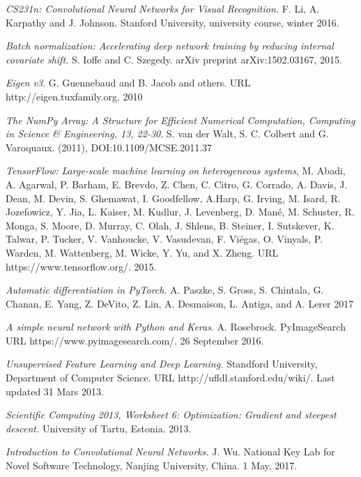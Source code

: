 \documentclass[a4paper, twoside]{article}
\begin{document}
\begin{thebibliography}{99}	
	\textit{CS231n: Convolutional Neural Networks for Visual Recognition.}
    F. Li, A. Karpathy and J. Johnson.
	Stanford University, university course, winter 2016.
	
	\textit{Batch normalization: Accelerating deep network training by reducing internal covariate shift.}
    S. Ioffe and C. Szegedy. 
	arXiv preprint arXiv:1502.03167, 2015.

\textit{Eigen v3}.
G. Guennebaud and B. Jacob and others. URL http://eigen.tuxfamily.org. 2010

\textit{The NumPy Array: A Structure for Efficient Numerical Computation, Computing in Science \& Engineering, 13, 22-30}.
S. van der Walt, S. C. Colbert and G. Varoquaux.  (2011), DOI:10.1109/MCSE.2011.37 

 

\textit{TensorFlow: Large-scale machine learning on heterogeneous systems},
M. Abadi, A. Agarwal, P. Barham, E. Brevdo,
Z. Chen, C. Citro, G. Corrado, A. Davis,
J. Dean, M. Devin, S. Ghemawat, I. Goodfellow,
A.Harp, G. Irving, M. Isard, R. Jozefowicz, Y. Jia,
L. Kaiser, M. Kudlur, J. Levenberg, D. Mané, M. Schuster,
R. Monga, S. Moore, D. Murray, C. Olah, J. Shlens,
B. Steiner, I. Sutskever, K. Talwar, P. Tucker,
V. Vanhoucke, V. Vasudevan, F. Viégas,
O. Vinyals, P. Warden, M. Wattenberg, M. Wicke,
Y. Yu, and X. Zheng.
URL https://www.tensorflow.org/.
2015.

\textit{Automatic differentiation in PyTorch}.
A. Paszke,   S. Gross, S. Chintala,   G. Chanan,   E. Yang,   Z. DeVito,   Z. Lin,   A. Desmaison,   L. Antiga,  and A. Lerer
2017

	\textit{A simple neural network with Python and Keras}.
	A. Rosebrock.
	PyImageSearch
	URL https://www.pyimagesearch.com/.
	26 September 2016.
	
	\textit{Unsupervised Feature Learning and Deep Learning.}
    Standford University, Department of Computer Science.
    URL http://ufldl.stanford.edu/wiki/.
	Last updated 31 Mars 2013.	
	

	
	\textit{Scientific Computing 2013, Worksheet 6: Optimization: Gradient and steepest descent.}
    University of Tartu, Estonia.
    2013.
    
	\textit{Introduction to Convolutional Neural Networks.}
    J. Wu. 
    National Key Lab for Novel Software Technology, Nanjing University, China.
    1 May, 2017.
    

\end{thebibliography}
\end{document}
